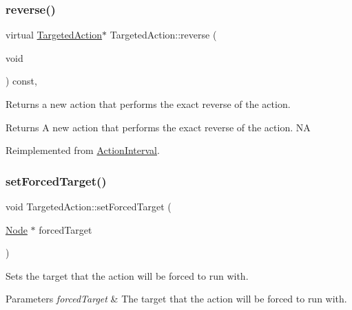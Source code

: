 \mbox{\label{classTargetedAction_aba40e6b10ed5123d26a3adc05933c561}} 
\subsubsection{\texorpdfstring{reverse()}{reverse()}\hspace{0.1cm}{\footnotesize\ttfamily [2/2]}}
{\footnotesize\ttfamily virtual \hyperlink{classTargetedAction}{Targeted\+Action}$\ast$ Targeted\+Action\+::reverse (\begin{DoxyParamCaption}\item[{void}]{ }\end{DoxyParamCaption}) const\hspace{0.3cm}{\ttfamily [override]}, {\ttfamily [virtual]}}

Returns a new action that performs the exact reverse of the action.

\begin{DoxyReturn}{Returns}
A new action that performs the exact reverse of the action.  NA 
\end{DoxyReturn}


Reimplemented from \hyperlink{classActionInterval_a9f9ac7164036a0bc261a72f62a2b2da7}{Action\+Interval}.

\mbox{\label{classTargetedAction_a8a5c10c4a6f2ffefc28867da3fe8a159}} 
\subsubsection{\texorpdfstring{set\+Forced\+Target()}{setForcedTarget()}\hspace{0.1cm}{\footnotesize\ttfamily [1/2]}}
{\footnotesize\ttfamily void Targeted\+Action\+::set\+Forced\+Target (\begin{DoxyParamCaption}\item[{\hyperlink{classNode}{Node} $\ast$}]{forced\+Target }\end{DoxyParamCaption})}

Sets the target that the action will be forced to run with.


\begin{DoxyParams}{Parameters}
{\em forced\+Target} & The target that the action will be forced to run with. \\
\hline
\end{DoxyParams}
\mbox{\label{classTargetedAction_a8a5c10c4a6f2ffefc28867da3fe8a159}} 
